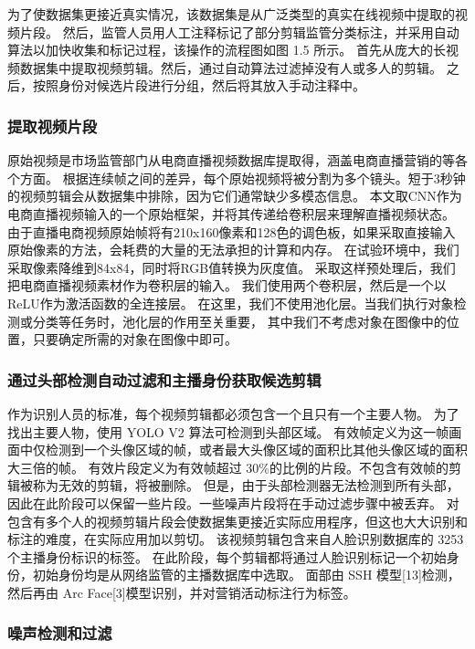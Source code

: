 为了使数据集更接近真实情况，该数据集是从广泛类型的真实在线视频中提取的视频片段。
然后，监管人员用人工注释标记了部分剪辑监管分类标注，并采用自动算法以加快收集和标记过程，该操作的流程图如图 1.5 所示。
首先从庞大的长视频数据集中提取视频剪辑。然后，通过自动算法过滤掉没有人或多人的剪辑。
之后，按照身份对候选片段进行分组，然后将其放入手动注释中。

\subsubsection{提取视频片段}

原始视频是市场监管部门从电商直播视频数据库提取得，涵盖电商直播营销的等各个方面。
根据连续帧之间的差异，每个原始视频将被分割为多个镜头。短于3秒钟的视频剪辑会从数据集中排除，因为它们通常缺少多模态信息。
本文取CNN作为电商直播视频输入的一个原始框架，并将其传递给卷积层来理解直播视频状态。
由于直播电商视频原始帧将有210x160像素和128色的调色板，如果采取直接输入原始像素的方法，会耗费的大量的无法承担的计算和内存。
在试验环境中，我们采取像素降维到84x84，同时将RGB值转换为灰度值。
采取这样预处理后，我们把电商直播视频素材作为卷积层的输入。
我们使用两个卷积层，然后是一个以ReLU作为激活函数的全连接层。
在这里，我们不使用池化层。当我们执行对象检测或分类等任务时，池化层的作用至关重要，
其中我们不考虑对象在图像中的位置，只要确定所需的对象在图像中即可。

\subsubsection{通过头部检测自动过滤和主播身份获取候选剪辑}

作为识别人员的标准，每个视频剪辑都必须包含一个且只有一个主要人物。
为了找出主要人物，使用 YOLO V2 算法可检测到头部区域。
有效帧定义为这一帧画面中仅检测到一个头像区域的帧，或者最大头像区域的面积比其他头像区域的面积大三倍的帧。
有效片段定义为有效帧超过 30\%的比例的片段。不包含有效帧的剪辑被称为无效的剪辑，将被删除。
但是，由于头部检测器无法检测到所有头部，因此在此阶段可以保留一些片段。一些噪声片段将在手动过滤步骤中被丢弃。
对包含有多个人的视频剪辑片段会使数据集更接近实际应用程序，但这也大大识别和标注的难度，在实际应用加以剪切。
该视频剪辑包含来自人脸识别数据库的 3253 个主播身份标识的标签。
在此阶段，每个剪辑都将通过人脸识别标记一个初始身份，初始身份均是从网络监管的主播数据库中选取。
面部由 SSH 模型[13]检测，然后再由 Arc Face[3]模型识别，并对营销活动标注行为标签。

\subsubsection{噪声检测和过滤}

